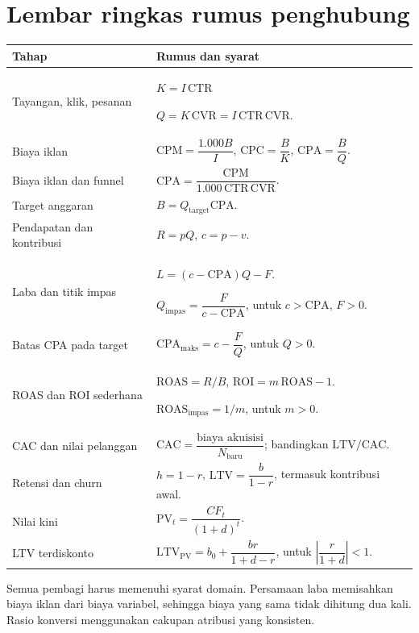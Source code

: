 \documentclass[11pt,a4paper]{article}
\newcommand{\CTR}{\mathrm{CTR}}
\newcommand{\CVR}{\mathrm{CVR}}
\newcommand{\CPM}{\mathrm{CPM}}
\newcommand{\CPC}{\mathrm{CPC}}
\newcommand{\CPA}{\mathrm{CPA}}
\newcommand{\CAC}{\mathrm{CAC}}
\newcommand{\ROAS}{\mathrm{ROAS}}
\newcommand{\ROI}{\mathrm{ROI}}
\newcommand{\LTV}{\mathrm{LTV}}
\newcommand{\PV}{\mathrm{PV}}
\begin{document}
\section{Lembar ringkas rumus penghubung}
\begingroup
\setlength{\lineskip}{4pt}
\setlength{\lineskiplimit}{4pt}
\begin{longtable}{@{}>{\raggedright\arraybackslash}p{45mm}>{\raggedright\arraybackslash}p{105mm}@{}}
\toprule\textbf{Tahap}&\textbf{Rumus dan syarat}\\\midrule\endhead
Tayangan, klik, pesanan&\(K=I\,\CTR\)\par\vspace{5pt}\(Q=K\,\CVR=I\,\CTR\,\CVR\).\\\addlinespace[10pt]
Biaya iklan&\(\CPM=\dfrac{1.000B}{I}\), \(\CPC=\dfrac{B}{K}\), \(\CPA=\dfrac{B}{Q}\).\\\addlinespace[10pt]
Biaya iklan dan funnel&\(\CPA=\dfrac{\CPM}{1.000\,\CTR\,\CVR}\).\\\addlinespace[10pt]
Target anggaran&\(B=Q_{\text{target}}\CPA\).\\\addlinespace[10pt]
Pendapatan dan kontribusi&\(R=pQ\), \(c=p-v\).\\\addlinespace[10pt]
Laba dan titik impas&\(L=(c-\CPA)Q-F\).\par\vspace{5pt}\(Q_{\text{impas}}=\dfrac{F}{c-\CPA}\), untuk \(c>\CPA\), \(F>0\).\\\addlinespace[10pt]
Batas CPA pada target&\(\CPA_{\text{maks}}=c-\dfrac{F}{Q}\), untuk \(Q>0\).\\\addlinespace[10pt]
ROAS dan ROI sederhana&\(\ROAS=R/B\), \(\ROI=m\,\ROAS-1\).\par\vspace{5pt}\(\ROAS_{\text{impas}}=1/m\), untuk \(m>0\).\\\addlinespace[10pt]
CAC dan nilai pelanggan&\(\CAC=\dfrac{\text{biaya akuisisi}}{N_{\text{baru}}}\); bandingkan \(\LTV/\CAC\).\\\addlinespace[10pt]
Retensi dan churn&\(h=1-r\), \(\LTV=\dfrac{b}{1-r}\), termasuk kontribusi awal.\\\addlinespace[10pt]
Nilai kini&\(\PV_t=\dfrac{CF_t}{(1+d)^t}\).\\\addlinespace[10pt]
LTV terdiskonto&\(\LTV_{\PV}=b_0+\dfrac{br}{1+d-r}\), untuk \(\left|\dfrac{r}{1+d}\right|<1\).\\
\bottomrule
\end{longtable}
\endgroup
Semua pembagi harus memenuhi syarat domain. Persamaan laba memisahkan biaya iklan dari biaya variabel, sehingga biaya yang sama tidak dihitung dua kali. Rasio konversi menggunakan cakupan atribusi yang konsisten.
\end{document}
